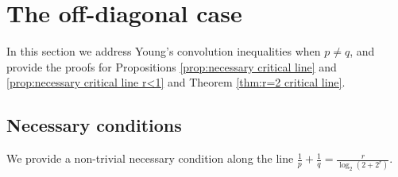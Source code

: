 \documentclass[reqno, 10pt]{amsart}
\theoremstyle{plain}
\numberwithin{equation}{section}
\theoremstyle{definition}
\newtheorem*{induction hypothesis}{Induction hypothesis}
\theoremstyle{remark}
\begin{document}
\section{The off-diagonal case}\label{sec:off-diagonal}

In this section we address Young's convolution inequalities when $p \neq q$, and provide the proofs for Propositions \ref{prop:necessary critical line} and \ref{prop:necessary critical line r<1} and Theorem \ref{thm:r=2 critical line}.

\subsection{Necessary conditions}\label{subsec:nec}

We provide a non-trivial necessary condition along the line $\frac{1}{p}+\frac{1}{q}=\frac{r}{\log_2(2+2^r)}$.
\end{document}
